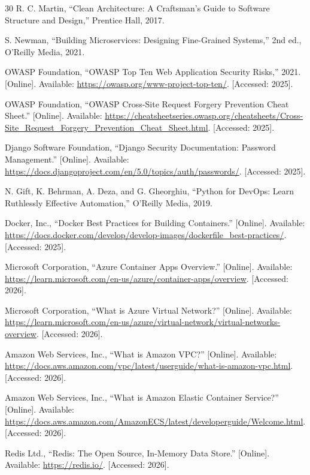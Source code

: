 \begin{thebibliography}{30}
R. C. Martin, ``Clean Architecture: A Craftsman's Guide to Software Structure and Design,'' Prentice Hall, 2017.

S. Newman, ``Building Microservices: Designing Fine-Grained Systems,'' 2nd ed., O'Reilly Media, 2021.

OWASP Foundation, ``OWASP Top Ten Web Application Security Risks,'' 2021. [Online]. Available: \url{https://owasp.org/www-project-top-ten/}. [Accessed: 2025].

OWASP Foundation, ``OWASP Cross-Site Request Forgery Prevention Cheat Sheet.'' [Online]. Available: \url{https://cheatsheetseries.owasp.org/cheatsheets/Cross-Site_Request_Forgery_Prevention_Cheat_Sheet.html}. [Accessed: 2025].

Django Software Foundation, ``Django Security Documentation: Password Management.'' [Online]. Available: \url{https://docs.djangoproject.com/en/5.0/topics/auth/passwords/}. [Accessed: 2025].

N. Gift, K. Behrman, A. Deza, and G. Gheorghiu, ``Python for DevOps: Learn Ruthlessly Effective Automation,'' O'Reilly Media, 2019.

Docker, Inc., ``Docker Best Practices for Building Containers.'' [Online]. Available: \url{https://docs.docker.com/develop/develop-images/dockerfile_best-practices/}. [Accessed: 2025].

Microsoft Corporation, ``Azure Container Apps Overview.'' [Online]. Available: \url{https://learn.microsoft.com/en-us/azure/container-apps/overview}. [Accessed: 2026].

Microsoft Corporation, ``What is Azure Virtual Network?'' [Online]. Available: \url{https://learn.microsoft.com/en-us/azure/virtual-network/virtual-networks-overview}. [Accessed: 2026].

Amazon Web Services, Inc., ``What is Amazon VPC?'' [Online]. Available: \url{https://docs.aws.amazon.com/vpc/latest/userguide/what-is-amazon-vpc.html}. [Accessed: 2026].

Amazon Web Services, Inc., ``What is Amazon Elastic Container Service?'' [Online]. Available: \url{https://docs.aws.amazon.com/AmazonECS/latest/developerguide/Welcome.html}. [Accessed: 2026].

Redis Ltd., ``Redis: The Open Source, In-Memory Data Store.'' [Online]. Available: \url{https://redis.io/}. [Accessed: 2026].

\end{thebibliography}
